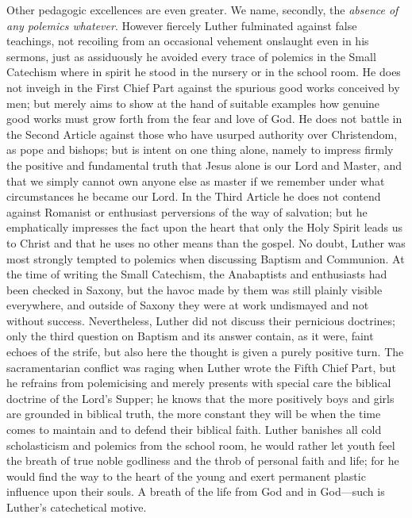 Other pedagogic excellences are even greater. We name, secondly, the \emph{absence of any polemics whatever}. However fiercely Luther fulminated against false teachings, not recoiling from an occasional vehement onslaught even in his sermons, just as assiduously he avoided every trace of polemics in the Small Catechism where in spirit he stood in the nursery or in the school room. He does not inveigh in the First Chief Part against the spurious good works conceived by men; but merely aims to show at the hand of suitable examples how genuine good works must grow forth from the fear and love of God. He does not battle in the Second Article against those who have usurped authority over Christendom, as pope and bishops; but is intent on one thing alone, namely to impress firmly the positive and fundamental truth that Jesus alone is our Lord and Master, and that we simply cannot own anyone else as master if we remember under what circumstances he became our Lord. In the Third Article he does not contend against Romanist or enthusiast perversions of the way of salvation; but he emphatically impresses the fact upon the heart that only the Holy Spirit leads us to Christ and that he uses no other means than the gospel. No doubt, Luther was most strongly tempted to polemics when discussing Baptism and Communion. At the time of writing the Small Catechism, the Anabaptists and enthusiasts had been checked in Saxony, but the havoc made by them was still plainly visible everywhere, and outside of Saxony they were at work undismayed
and not without success. Nevertheless, Luther did not discuss their pernicious doctrines; only the third question on Baptism and its answer contain, as it were, faint echoes of the strife, but also here the thought is given a purely positive turn. The sacramentarian conflict was raging when Luther wrote the Fifth Chief Part, but he refrains from polemicising and merely presents with special care the biblical doctrine of the Lord’s Supper; he knows that the more positively boys and girls are grounded in biblical truth, the more constant they will be when the time comes to maintain and to defend their biblical faith. Luther banishes all cold scholasticism and polemics from the school room, he would rather let youth feel the breath of true noble godliness and the throb of personal faith and life; for he would find the way to the heart of the young and exert permanent plastic influence upon their souls. A breath of the life from God and in God—such is Luther’s catechetical motive.

